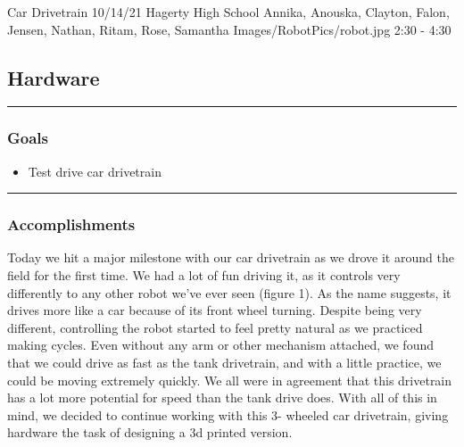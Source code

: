 \insertmeeting 
  {Car Drivetrain} 
  {10/14/21}
  {Hagerty High School}
  {Annika, Anouska, Clayton, Falon, Jensen, Nathan, Ritam, Rose, Samantha}
  {Images/RobotPics/robot.jpg}
  {2:30 - 4:30}
  
\subsection*{Hardware}
\noindent\hfil\rule{\textwidth}{.4pt}\hfil
\subsubsection*{Goals}
\begin{itemize}
    \item Test drive car drivetrain

\end{itemize} 

\noindent\hfil\rule{\textwidth}{.4pt}\hfil

\subsubsection*{Accomplishments}
Today we hit a major milestone with our car drivetrain as we drove it around the field for the first time. We had a lot of fun driving it, as it controls very differently to any other robot we’ve ever seen (figure 1). As the name suggests, it drives more like a car because of its front wheel turning. Despite being very different, controlling the robot started to feel pretty natural as we practiced making cycles. Even without any arm or other mechanism attached, we found that we could drive as fast as the tank drivetrain, and with a little practice, we could be moving extremely quickly. We all were in agreement that this drivetrain has a lot more potential for speed than the tank drive does. With all of this in mind, we decided to continue working with this 3- wheeled car drivetrain, giving hardware the task of designing a 3d printed version.
 

